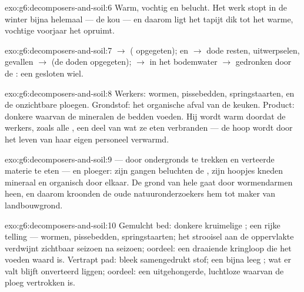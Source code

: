 \begin{solution}{exo:g6:decomposers-and-soil:6}
Warm, vochtig en belucht. Het werk stopt in de winter bijna helemaal ---
de kou --- en daarom ligt het tapijt dik tot het warme, vochtige
voorjaar het opruimt.
\end{solution}

\begin{solution}{exo:g6:decomposers-and-soil:7}
 $\rightarrow$  ( opgegeten);  en
 $\rightarrow$ dode resten, uitwerpselen, gevallen 
$\rightarrow$  (de doden opgegeten);  $\rightarrow$
 in het bodemwater $\rightarrow$ gedronken door de
: een gesloten wiel.
\end{solution}

\begin{solution}{exo:g6:decomposers-and-soil:8}
Werkers: wormen, pissebedden, springstaarten,  en de
onzichtbare ploegen. Grondstof: het organische afval van de keuken.
Product: donkere  waarvan de mineralen de bedden voeden. Hij wordt
warm doordat de werkers, zoals alle , een deel van wat ze eten
verbranden --- de hoop wordt door het leven van haar eigen personeel
verwarmd.
\end{solution}

\begin{solution}{exo:g6:decomposers-and-soil:9}
 --- door  ondergronds te trekken en verteerde materie te
eten --- en ploeger: zijn gangen beluchten de , zijn hoopjes kneden
mineraal en organisch door elkaar. De grond van hele  gaat door
wormendarmen heen, en daarom kroonden de oude natuuronderzoekers hem tot
maker van landbouwgrond.
\end{solution}

\begin{solution}{exo:g6:decomposers-and-soil:10}
Gemulcht bed: donkere kruimelige ; een rijke telling --- wormen,
pissebedden, springstaarten; het strooisel aan de oppervlakte verdwijnt
zichtbaar seizoen na seizoen; oordeel: een draaiende kringloop die het
voeden waard is. Vertrapt pad: bleek samengedrukt stof; een bijna leeg
; wat er valt blijft onverteerd liggen; oordeel: een uitgehongerde,
luchtloze  waarvan de ploeg vertrokken is.
\end{solution}

